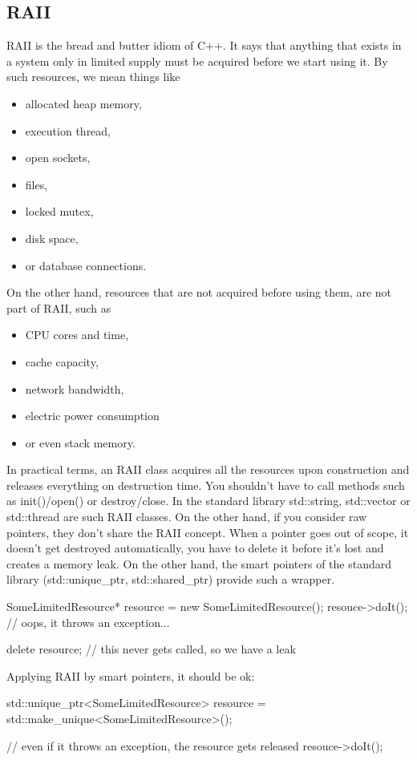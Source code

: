 \documentclass{report}
\begin{document}
\subsection{RAII}
\bigbreak \noindent 
RAII is the bread and butter idiom of C++. It says that anything that
exists in a system only in limited supply must be acquired before
we start using it.
\bigbreak \noindent 
By such resources, we mean things like
\begin{itemize}
    \item allocated heap memory,
    \item execution thread,
    \item open sockets,
    \item files,
    \item locked mutex,
    \item disk space,
    \item or database connections.
\end{itemize}
\bigbreak \noindent 
On the other hand, resources that are not acquired before using
them, are not part of RAII, such as 
\begin{itemize}
    \item CPU cores and time,
    \item cache capacity,
    \item network bandwidth,
    \item electric power consumption
    \item or even stack memory.
\end{itemize}
\bigbreak \noindent 
In practical terms, an RAII class acquires all the resources
upon construction and releases everything on destruction time.
You shouldn’t have to call methods such as init()/open()
or destroy/close.
\bigbreak \noindent 
In the standard library std::string, std::vector or std::thread
are such RAII classes.
\bigbreak \noindent 
On the other hand, if you consider raw pointers, they don’t share
the RAII concept. When a pointer goes out of scope, it doesn’t get
destroyed automatically, you have to delete it before it’s lost and
creates a memory leak. On the other hand, the smart pointers of
the standard library (std::unique\_ptr, std::shared\_ptr) provide
such a wrapper.
\bigbreak \noindent 
\begin{cppcode}
    SomeLimitedResource* resource = new SomeLimitedResource();
    resouce->doIt(); // oops, it throws an exception...

    delete resource; // this never gets called, so we have a leak
\end{cppcode}
\bigbreak \noindent 
Applying RAII by smart pointers, it should be ok:
\bigbreak \noindent 
\begin{cppcode}
    std::unique_ptr<SomeLimitedResource> resource =
    std::make_unique<SomeLimitedResource>();

    // even if it throws an exception, the resource gets released
    resouce->doIt();
\end{cppcode}
\end{document}
